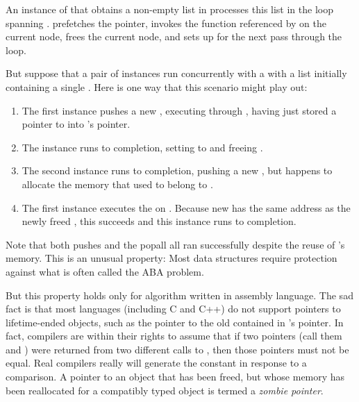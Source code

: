 \begin{fcvref}
An instance of  that obtains a non-empty list in
 processes this list in the loop spanning
.
 prefetches the  pointer,
 invokes the function referenced by  on the
current node,
 frees the current node, and
 sets up  for the next pass through the loop.

But suppose that a pair of  instances run concurrently
with a  with a list initially containing a single
.
Here is one way that this scenario might play out:

\begin{enumerate}
\item	The first  instance pushes a new ,
	executing through , having just stored
	a pointer to  into 's  pointer.
\item	The  instance runs to completion,
	setting  to  and freeing .
\item	The second  instance runs to completion,
	pushing a new , but happens to allocate the memory
	that used to belong to .
\item	The first  instance executes the 
	on .
	Because new  has the same address as the newly freed ,
	this  succeeds and this  instance
	runs to completion.
\end{enumerate}

Note that both pushes and the popall all ran successfully despite the
reuse of 's memory.
This is an unusual property: Most data structures require protection
against what is often called the ABA problem.

But this property holds only for algorithm written in assembly
language.
The sad fact is that most languages (including C and C++) do not support
pointers to lifetime-ended objects, such as the pointer to the old 
contained in 's  pointer.
In fact, compilers are within their rights to assume that if two pointers
(call them  and ) were returned from two different calls to
, then those pointers must not be equal.
Real compilers really will generate the constant  in
response to a  comparison.
A pointer to an object that has been freed, but whose memory has been
reallocated for a compatibly typed object is termed a \emph{zombie pointer}.


\end{fcvref}
